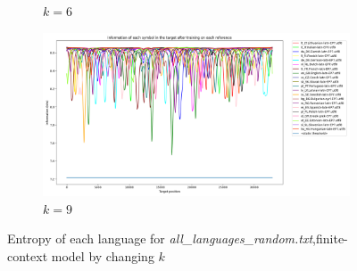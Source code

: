 \documentclass{article}
\begin{document}
\begin{figure}
\begin{subfigure}[b]{0.3\textwidth}
        \caption{$k = 6$}
        \label{fig:all_languages_random_p_c:1:6}
    \end{subfigure}
    \hfill
    \begin{subfigure}[b]{0.3\textwidth}
        \begin{center}
            \includegraphics[width=1.0\linewidth]{../results/all_languages_random/-p_c:1:9.png}
        \end{center}
        \caption{$k = 9$}
        \label{fig:all_languages_random_p_c:1:9}
    \end{subfigure}
    
    \caption{Entropy of each language for \textit{all\_languages\_random.txt},finite-context model by changing $k$}
    \label{fig:all_languages_random_p_c}
\end{figure}
\end{document}
